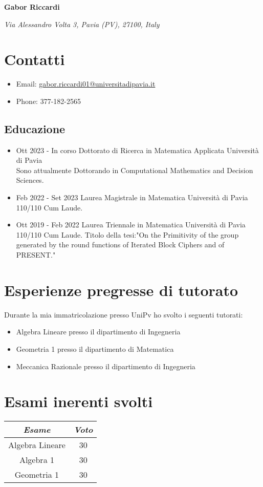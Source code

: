 \documentclass[]{article}
\begin{document}
\begin{center}
    \LARGE
    {\bf Gabor Riccardi}
\end{center}

\begin{center}
    \large
    {\em Via Alessandro Volta 3, Pavia (PV), 27100, Italy}
\end{center}

\section*{Contatti}
\begin{itemize}
    \item Email: \href{mailto:gabor.riccardi01@universitadipavia.it}{gabor.riccardi01@universitadipavia.it}
    \item Phone: 377-182-2565
\end{itemize}


\subsection*{Educazione}
\begin{itemize}
    \item {Ott 2023 - In corso }{Dottorato di Ricerca in Matematica Applicata}{ Università di Pavia}{ \\Sono attualmente Dottorando in Computational Mathematics and Decision Sciences.}
    \item {Feb 2022 - Set 2023 }{Laurea Magistrale in Matematica}{ Università di Pavia}{\\ 110/110 Cum Laude.}
    \item {Ott 2019 - Feb 2022 }{Laurea Triennale in Matematica}{ Università di Pavia}{\\ 110/110 Cum Laude. Titolo della tesi:"On the Primitivity of the group
generated by the round functions of Iterated Block Ciphers and of PRESENT."}
\end{itemize}


\section*{Esperienze pregresse di tutorato}
Durante la mia immatricolazione presso UniPv ho svolto i seguenti tutorati:
\begin{itemize}
    \item Algebra Lineare presso il dipartimento di Ingegneria
    \item Geometria 1 presso il dipartimento di Matematica
    \item Meccanica Razionale presso il dipartimento di Ingegneria
\end{itemize}


\section*{Esami inerenti svolti}
\begin{center}
\begin{tabular}{c  c} 
 \hline \emph{Esame}  & \emph{Voto} \\ 
 \hline
 Algebra Lineare & 30 \\
 \hline
 Algebra 1 & 30 \\
 \hline
 Geometria 1 & 30 \\
 \hline
\end{tabular}
\end{center}
\end{document}
